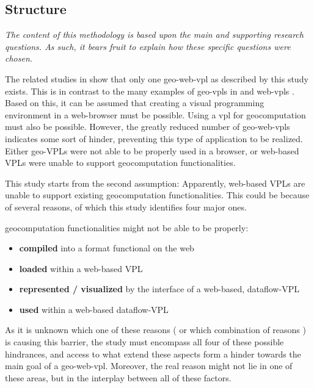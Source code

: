 \subsection*{Structure}
  
\emph{The content of this methodology is based upon the main and supporting research questions. 
As such, it bears fruit to explain how these specific questions were chosen.}

The related studies in  show that only one \ac{geo-web-vpl} as described by this study exists. This is in contrast to the many examples of geo-vpls in  and web-vpls . 
Based on this, it can be assumed that creating a visual programming environment in a web-browser must be possible. 
Using a \ac*{vpl} for geocomputation must also be possible. 
However, the greatly reduced number of geo-web-vpls indicates some sort of hinder, preventing this type of application to be realized. Either geo-VPLs were not able to be properly used in a browser, or web-based VPLs were unable to support geocomputation functionalities. 

This study starts from the second assumption: 
Apparently, web-based VPLs are unable to support existing geocomputation functionalities. 
This could be because of several reasons, of which this study identifies four major ones.

geocomputation functionalities might not be able to be properly:
\begin{itemize}[-]
  \item \textbf{compiled} into a format functional on the web
  \item \textbf{loaded} within a web-based VPL
  \item \textbf{represented / visualized} by the interface of a web-based, dataflow-VPL
  \item \textbf{used} within a web-based dataflow-VPL
\end{itemize}
As it is unknown which one of these reasons ( or which combination of reasons ) is causing this barrier, the study must encompass all four of these possible hindrances, and access to what extend these aspects form a hinder towards the main goal of a \ac{geo-web-vpl}. 
Moreover, the real reason might not lie in one of these areas, but in the interplay between all of these factors. 

